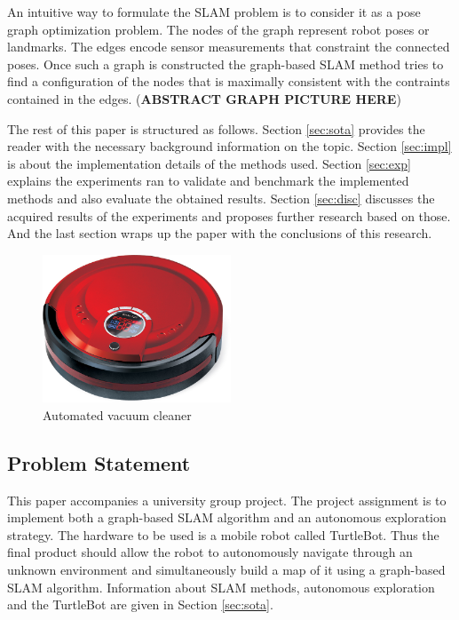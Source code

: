 \documentclass{ba-kecs}
\begin{document}
An intuitive way to formulate the SLAM problem is to consider it as a pose graph optimization problem. The nodes of the graph represent robot poses or landmarks. The edges encode sensor measurements that constraint the connected poses. Once such a graph is constructed the graph-based SLAM method tries to find a configuration of the nodes that is maximally consistent with the contraints contained in the edges. (\textbf{ABSTRACT GRAPH PICTURE HERE})

The rest of this paper is structured as follows. Section \ref{sec:sota} provides the reader with the necessary background information on the topic. Section \ref{sec:impl} is about the implementation details of the methods used. Section \ref{sec:exp} explains the experiments ran to validate and benchmark the implemented methods and also evaluate the obtained results. Section \ref{sec:disc} discusses the acquired results of the experiments and proposes further research based on those. And the last section wraps up the paper with the conclusions of this research.

\begin{figure}[htp]
	\centering
		\includegraphics[width=0.50\textwidth]{figures/vacuum_cleaner.jpg}
	\caption{Automated vacuum cleaner}
	\label{fig:vacuum_cleaner}
\end{figure}

\subsection{Problem Statement}
\label{sec:problem}
This paper accompanies a university group project. The project assignment is to implement both a graph-based SLAM algorithm and an autonomous exploration strategy. The hardware to be used is a mobile robot called TurtleBot. Thus the final product should allow the robot to autonomously navigate through an unknown environment and simultaneously build a map of it using a graph-based SLAM algorithm. Information about SLAM methods, autonomous exploration and the TurtleBot are given in Section \ref{sec:sota}.  
\end{document}
